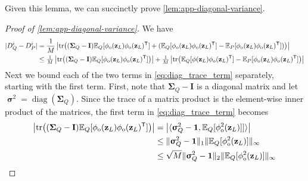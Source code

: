 \documentclass[twoside]{article}
\renewcommand{\ss}[1]{_{\text{#1}}}
\newcommand{\vz}{\mathbf{z}}
\newcommand{\vsigma}{\bm{\upsigma}}
\newcommand{\vone}{\mathbf{1}}
\newcommand{\mI}{\mathbf{I}}
\newcommand{\mSigma}{\mathbf{\Sigma}}
\newcommand{\E}{\mathbb{E}}
\renewcommand{\P}{\mathbb{P}}
\newcommand{\Q}{\mathbb{Q}}
\renewcommand{\Q}{\ensuremath{Q}}
\renewcommand{\P}{\ensuremath{P}}
\newcommand{\T}{\text{\textsf{T}}}
\newcommand{\opspace}{}
\newcommand{\diag}{\operatorname{diag}\opspace}
\renewcommand{\ss}[1]{_{\text{#1}}}        %
\DeclarePairedDelimiter\parens{(}{)}             %
\theoremstyle{theoremstyle}
\begin{document}
Given this lemma, we can succinctly prove \cref{lem:app-diagonal-variance}.
\begin{proof}[Proof of \cref{lem:app-diagonal-variance}]
We have
\begin{align}
    |D^{i}_{\Q}- D^{i}_{\P}| &= \frac{1}{M}\left\lvert\mathrm{tr}\parens*{
        \parens*{\mSigma_Q- \mI}\E_{\Q}[\phi\ss{o}(\vz_{L})\phi\ss{o}(\vz_{L})^\T]
            + (\E_{\Q}[\phi\ss{o}(\vz_{L})\phi\ss{o}(\vz_{L})^\T]-\E_{\P}[\phi\ss{o}(\vz_{L})\phi\ss{o}(\vz_{L})^\T])
    }
    \right\rvert
    \\
    &\le \tfrac{1}{M}\left\lvert\mathrm{tr}\parens*{
        \parens*{\mSigma_Q- \mI}\E_{\Q}[\phi\ss{o}(\vz_{L})\phi\ss{o}(\vz_{L})^\T]
        } \right\rvert
        + \tfrac{1}{M}\left\lvert\mathrm{tr}\parens*{\E_{\Q}[\phi(\vz_{L})\phi\ss{o}(\vz_{L})^\T]-\E_{\P}[\phi\ss{o}(\vz_{L})\phi\ss{o}(\vz_{L})^\T]}\right\rvert \label{eq:diag_trace_term}
\end{align}
Next we bound each of the two terms in \cref{eq:diag_trace_term} separately, starting with the first term. First, note that $\mSigma_Q - \mI$ is a diagonal matrix and let $\vsigma^2 = \diag(\mSigma_Q)$. Since the trace of a matrix product is the element-wise inner product of the matrices, the first term in \cref{eq:diag_trace_term} becomes
\begin{align}
    \left\lvert\mathrm{tr}\parens*{
        \parens*{\mSigma_Q- \mI}\E_{\Q}[\phi\ss{o}(\vz_{L})\phi\ss{o}(\vz_{L})^\T]} \right\rvert
    &= \left\lvert\langle \vsigma_Q^2 - \vone, \E_{\Q}[\phi\ss{o}^2(\vz_{L})]]\rangle \right\rvert
    \\
    &\leq \|\vsigma_Q^2 - \vone\|_1\|\E_{\Q}[\phi\ss{o}^2(\vz_{L}) ] \|_\infty 
    \\
    &\leq \sqrt{M} \|\vsigma_Q^2 - \vone\|_2 \|\E_{\Q}[\phi\ss{o}^2(\vz_{L})]\|_\infty
\end{align}

\end{proof}
\end{document}
